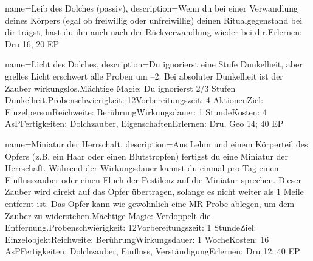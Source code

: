 {
    name={Leib des Dolches (passiv)},
    description={Wenn du bei einer Verwandlung deines Körpers (egal ob freiwillig oder unfreiwillig) deinen Ritualgegenstand bei dir trägst, hast du ihn auch nach der Rückverwandlung wieder bei dir.\newline Erlernen: Dru 16; 20 EP}
}


{
    name={Licht des Dolches},
    description={Du ignorierst eine Stufe Dunkelheit, aber grelles Licht erschwert alle Proben um –2. Bei absoluter Dunkelheit ist der Zauber wirkungslos.\newline Mächtige Magie: Du ignorierst 2/3 Stufen Dunkelheit.\newline Probenschwierigkeit: 12\newline Vorbereitungszeit: 4 Aktionen\newline Ziel: Einzelperson\newline Reichweite: Berührung\newline Wirkungsdauer: 1 Stunde\newline Kosten: 4 AsP\newline Fertigkeiten: Dolchzauber, Eigenschaften\newline Erlernen: Dru, Geo 14; 40 EP}
}


{
    name={Miniatur der Herrschaft},
    description={Aus Lehm und einem Körperteil des Opfers (z.B. ein Haar oder einen Blutstropfen) fertigst du eine Miniatur der Herrschaft. Während der Wirkungsdauer kannst du einmal pro Tag einen Einflusszauber oder einen Fluch der Pestilenz auf die Miniatur sprechen. Dieser Zauber wird direkt auf das Opfer übertragen, solange es nicht weiter als 1 Meile entfernt ist. Das Opfer kann wie gewöhnlich eine MR-Probe ablegen, um dem Zauber zu widerstehen.\newline Mächtige Magie: Verdoppelt die Entfernung.\newline Probenschwierigkeit: 12\newline Vorbereitungszeit: 1 Stunde\newline Ziel: Einzelobjekt\newline Reichweite: Berührung\newline Wirkungsdauer: 1 Woche\newline Kosten: 16 AsP\newline Fertigkeiten: Dolchzauber, Einfluss, Verständigung\newline Erlernen: Dru 12; 40 EP}
}


